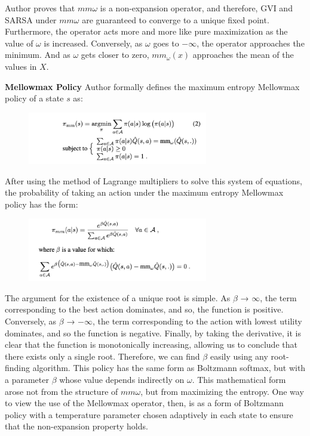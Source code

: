 Author proves that $mm\omega$ is a non-expansion operator, and therefore, GVI and SARSA under $mm\omega$ are guaranteed to converge to a unique fixed point.
Furthermore, the operator acts more and more like pure maximization as the value of $\omega$ is increased. Conversely, as $\omega$ goes to $-\infty$, the operator approaches the minimum.
And as ${\omega}$ gets closer to zero, $mm_{\omega}(x)$ approaches the
mean of the values in $X$.


\textbf{Mellowmax Policy}
\newline\newline
Author formally defines the maximum entropy Mellowmax policy of a state $s$ as:

\begin{figure}[htbp]
\centering
\includegraphics[width=0.7\textwidth]{entropy2.png}
\end{figure}

After using the method of Lagrange multipliers to solve this system of equations, the probability of taking an action under the maximum entropy Mellowmax policy has the form:

\begin{figure}[htbp]
\centering
\includegraphics[width=0.7\textwidth]{result2.png}
\end{figure}

The argument for the existence of a unique root is simple. As $\beta$ → $\infty$, the term corresponding to the best action dominates, and so, the function is positive. Conversely, as $\beta$ → $-\infty$, the term corresponding to the action with lowest utility dominates, and so the function is negative. Finally, by taking the derivative, it is clear that the function is monotonically increasing, allowing us to conclude that there exists only a single root. Therefore, we can find $\beta$ easily using any root-finding algorithm. 
\newline\newline
This policy has the same form as Boltzmann softmax, but with a parameter $\beta$ whose value depends indirectly on $\omega$. This mathematical form arose not from the structure of $mm\omega$, but from maximizing the entropy. One way to view the use of the Mellowmax operator, then, is as a form of Boltzmann policy with a temperature parameter chosen adaptively in each state to ensure that the non-expansion property holds.
